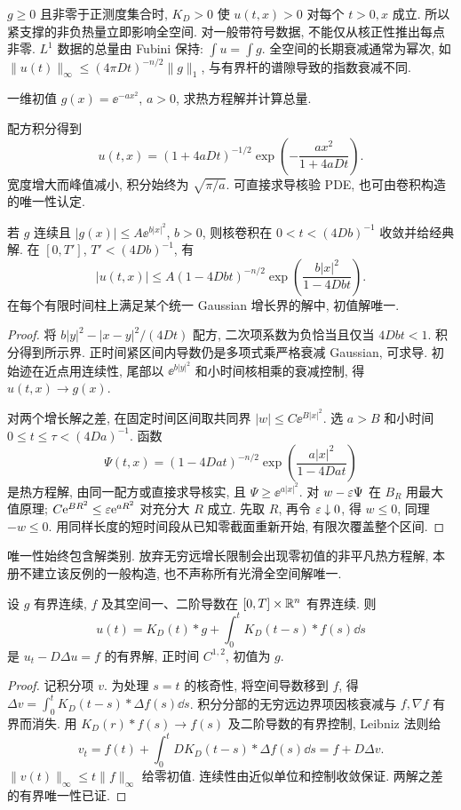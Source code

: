 $g\ge0$ 且非零于正测度集合时, $K_D>0$ 使 $u(t,x)>0$ 对每个 $t>0,x$ 成立. 所以紧支撑的非负热量立即影响全空间. 对一般带符号数据, 不能仅从核正性推出每点非零. $L^1$ 数据的总量由 Fubini 保持: $\int u=\int g$. 全空间的长期衰减通常为幂次, 如 $\|u(t)\|_\infty\le(4\pi Dt)^{-n/2}\|g\|_1$, 与有界杆的谱隙导致的指数衰减不同.
\begin{example}
一维初值 $g(x)=\ee^{-a x^2}$, $a>0$, 求热方程解并计算总量.
\end{example}
\begin{solution}
配方积分得到
\[
u(t,x)=(1+4aDt)^{-1/2}\exp\left(-\frac{a x^2}{1+4aDt}\right).
\]
宽度增大而峰值减小, 积分始终为 $\sqrt{\pi/a}$. 可直接求导核验 PDE, 也可由卷积构造的唯一性认定.
\end{solution}
\begin{proposition}\label{prop:growthheat}
若 $g$ 连续且 $|g(x)|\le A\ee^{b|x|^2}$, $b>0$, 则核卷积在 $0<t<(4Db)^{-1}$ 收敛并给经典解. 在 $[0,T']$, $T'<(4Db)^{-1}$, 有
\[
|u(t,x)|\le A(1-4Dbt)^{-n/2}\exp\left(\frac{b|x|^2}{1-4Dbt}\right).
\]
在每个有限时间柱上满足某个统一 Gaussian 增长界的解中, 初值解唯一.
\end{proposition}
\begin{proof}
将 $b|y|^2-|x-y|^2/(4Dt)$ 配方, 二次项系数为负恰当且仅当 $4Dbt<1$. 积分得到所示界. 正时间紧区间内导数仍是多项式乘严格衰减 Gaussian, 可求导. 初始迹在近点用连续性, 尾部以 $\ee^{b|y|^2}$ 和小时间核相乘的衰减控制, 得 $u(t,x)\to g(x)$.

对两个增长解之差, 在固定时间区间取共同界 $|w|\le C\ee^{B|x|^2}$. 选 $a>B$ 和小时间 $0\le t\le\tau<(4Da)^{-1}$. 函数
\[
\Psi(t,x)=(1-4Dat)^{-n/2}\exp\left(\frac{a|x|^2}{1-4Dat}\right)
\]
是热方程解, 由同一配方或直接求导核实, 且 $\Psi\ge\ee^{a|x|^2}$. 对 $w-\varepsilon\Psi$ 在 $B_R$ 用最大值原理; $C\mathrm e^{BR^2}\le\varepsilon\mathrm e^{aR^2}$ 对充分大 $R$ 成立. 先取 $R$, 再令 $\varepsilon\downarrow0$, 得 $w\le0$, 同理 $-w\le0$. 用同样长度的短时间段从已知零截面重新开始, 有限次覆盖整个区间.
\end{proof}
唯一性始终包含解类别. 放弃无穷远增长限制会出现零初值的非平凡热方程解, 本册不建立该反例的一般构造, 也不声称所有光滑全空间解唯一.
\begin{theorem}\label{thm:duhamelheat}
设 $g$ 有界连续, $f$ 及其空间一、二阶导数在 $[0,T]\times\mathbb R^n$ 有界连续. 则
\[
u(t)=K_D(t)*g+\int_0^tK_D(t-s)*f(s)\dd s
\]
是 $u_t-D\Delta u=f$ 的有界解, 正时间 $C^{1,2}$, 初值为 $g$.
\end{theorem}
\begin{proof}
记积分项 $v$. 为处理 $s=t$ 的核奇性, 将空间导数移到 $f$, 得 $\Delta v=\int_0^tK_D(t-s)*\Delta f(s)\dd s$. 积分分部的无穷远边界项因核衰减与 $f,\nabla f$ 有界而消失. 用 $K_D(r)*f(s)\to f(s)$ 及二阶导数的有界控制, Leibniz 法则给
\[
v_t=f(t)+\int_0^tD K_D(t-s)*\Delta f(s)\dd s=f+D\Delta v.
\]
$\|v(t)\|_\infty\le t\|f\|_\infty$ 给零初值. 连续性由近似单位和控制收敛保证. 两解之差的有界唯一性已证.
\end{proof}
